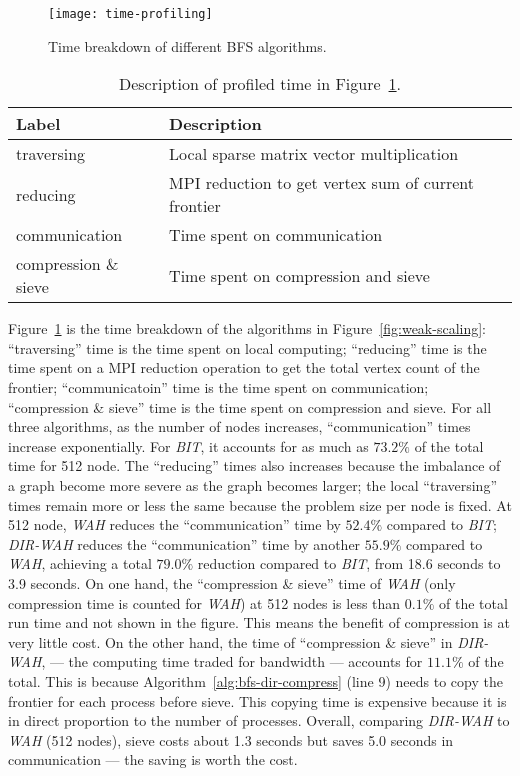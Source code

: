 \documentclass[conference]{IEEEtran}
\begin{document}
\begin{figure}[t]
  \centering
  \texttt{[image: time-profiling]}
  \caption{Time breakdown of different BFS algorithms.}
  \label{fig:time-profiling}
\end{figure}
\begin{table}[t]
  \label{table:time-profiling}
  \caption{Description of profiled time in Figure~\ref{fig:time-profiling}.}
  \begin{center}
    \begin{tabular}{ll}
      \toprule Label & Description \\ 
\midrule
      traversing & Local sparse matrix vector multiplication \\
      reducing & MPI reduction to get vertex sum of current frontier\\
      communication & Time spent on communication \\
      compression \& sieve & Time spent on compression and sieve \\
\bottomrule
    \end{tabular}
  \end{center}
\end{table}
Figure~\ref{fig:time-profiling} is the time breakdown of the algorithms in
Figure~\ref{fig:weak-scaling}: ``traversing'' time is the time spent on local
computing; ``reducing'' time is the time spent on a MPI reduction operation to
get the total vertex count of the frontier; ``communicatoin'' time is the time
spent on communication; ``compression \& sieve'' time is the time spent on
compression and sieve.  For all three algorithms, as the number of nodes
increases, ``communication'' times increase exponentially.  For \textit{BIT},
it accounts for as much as $73.2\%$ of the total time for 512 node.  The
``reducing'' times also increases because the imbalance of a graph become more
severe as the graph becomes larger; the local ``traversing'' times remain more
or less the same because the problem size per node is fixed. At 512 node,
\textit{WAH} reduces the ``communication'' time by $52.4\%$ compared to
\textit{BIT}; \textit{DIR-WAH} reduces the ``communication'' time by another
$55.9\%$ compared to \textit{WAH}, achieving a total $79.0\%$ reduction
compared to \textit{BIT}, from 18.6 seconds to 3.9 seconds. On one hand, the
``compression \& sieve'' time of \textit{WAH} (only compression time is
counted for \textit{WAH}) at 512 nodes is less than $0.1\%$ of the total run
time and not shown in the figure. This means the benefit of compression is at
very little cost. On the other hand, the time of ``compression \& sieve'' in
\textit{DIR-WAH}, --- the computing time traded for bandwidth --- accounts for
$11.1\%$ of the total.  This is because Algorithm~\ref{alg:bfs-dir-compress}
(line 9) needs to copy the frontier for each process before sieve. This
copying time is expensive because it is in direct proportion to the number of
processes. Overall, comparing \textit{DIR-WAH} to \textit{WAH} (512 nodes),
sieve costs about 1.3 seconds but saves 5.0 seconds in communication --- the
saving is worth the cost.
\end{document}
